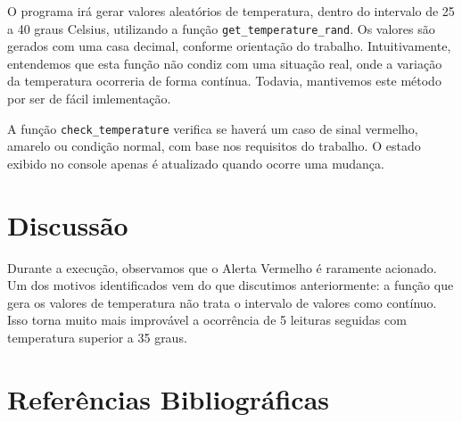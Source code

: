 \documentclass[12pt]{article}
\begin{document}
O programa irá gerar valores aleatórios de temperatura,
dentro do intervalo de 25 a 40 graus Celsius,
utilizando a função \texttt{get\_temperature\_rand}.
Os valores são gerados com uma casa decimal, conforme
orientação do trabalho. Intuitivamente, entendemos que
esta função não condiz com uma situação real,
onde a variação da temperatura ocorreria de forma contínua.
Todavia, mantivemos este método por ser de fácil imlementação.

A função \texttt{check\_temperature} verifica se haverá
um caso de sinal vermelho, amarelo ou condição normal,
com base nos requisitos do trabalho. O estado exibido
no console apenas é atualizado quando ocorre uma mudança.

\section{Discussão}

Durante a execução, observamos que o Alerta Vermelho
é raramente acionado. Um dos motivos identificados
vem do que discutimos anteriormente: a função que
gera os valores de temperatura não trata o intervalo
de valores como contínuo. Isso torna muito mais improvável
a ocorrência de 5 leituras seguidas com temperatura superior
a 35 graus.

\section{Referências Bibliográficas}
\end{document}
